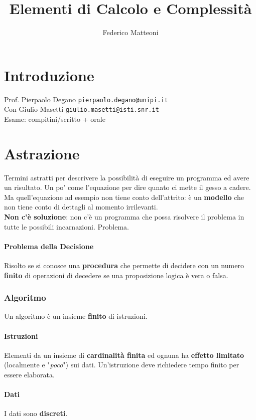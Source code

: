 \documentclass[10pt]{article}
\begin{document}
\title{Elementi di Calcolo e Complessità}
\author{Federico Matteoni}
\date{ }
\renewcommand*\contentsname{Indice}
\maketitle

\section{Introduzione}
Prof. Pierpaolo Degano \texttt{pierpaolo.degano@unipi.it}\\
Con Giulio Masetti \texttt{giulio.masetti@isti.snr.it}\\
Esame: compitini/scritto + orale

\section{Astrazione}
Termini astratti per descrivere la possibilità di eseguire un programma ed avere un risultato. Un po' come l'equazione per dire qunato ci mette il gesso a cadere.\\
Ma quell'equazione ad esempio non tiene conto dell'attrito: è un \textbf{modello} che non tiene conto di dettagli al momento irrilevanti.\\
\textbf{Non c'è soluzione}: non c'è un programma che possa risolvere il problema in tutte le possibili incarnazioni. Problema.
\paragraph{Problema della Decisione} Risolto se si conosce una \textbf{procedura} che permette di decidere con un numero \textbf{finito} di operazioni di decedere se una proposizione logica è vera o falsa.

\subsubsection{Algoritmo}
Un algoritmo è un insieme \textbf{finito} di istruzioni.
\paragraph{Istruzioni} Elementi da un insieme di \textbf{cardinalità finita} ed ognuna ha \textbf{effetto limitato} (localmente e "\textit{poco}") sui dati. Un'istruzione deve richiedere tempo finito per essere elaborata.
\paragraph{Dati} I dati sono \textbf{discreti}.
\end{document}
